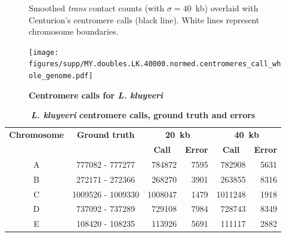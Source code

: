 \begin{figure}[ht!]

\caption{\textbf{Centromere calls for \textit{L. kluyveri}}}{
Smoothed \textit{trans} contact counts (with $\sigma=40$~kb) overlaid with
Centurion's centromere calls (black line). White lines represent chromosome
boundaries.
}
\begin{center}
\texttt{[image: figures/supp/MY.doubles.LK.40000.normed.centromeres\_call\_whole\_genome.pdf]}
\end{center}
\label{suppfig:LK_calls}
\end{figure}

\begin{table}[ht!]
\caption{\textbf{\textit{L. kluyveri} centromere calls, ground truth and
errors}}
\begin{center}
\begin{tabular}{c | c  r  r  r  r}
\textbf{Chromosome}  & \textbf{Ground truth} & \multicolumn{2}{c}{\textbf{20~kb}} & \multicolumn{2}{c}{\textbf{40~kb}} \\
  &   &  \multicolumn{1}{c}{\textbf{Call}} &  \multicolumn{1}{c}{\textbf{Error}} &  \multicolumn{1}{c}{\textbf{Call}} &  \multicolumn{1}{c}{\textbf{Error}} \\
\hline
A & \num[group-separator={\,}]{777082} - \num[group-separator={\,}]{777277} & \num[group-separator={\,}]{784872} & \small{\num[group-separator={\,}]{7595}}  & \num[group-separator={\,}]{782908} & \small{\num[group-separator={\,}]{5631}}  \\
B & \num[group-separator={\,}]{272171} - \num[group-separator={\,}]{272366} & \num[group-separator={\,}]{268270} & \small{\num[group-separator={\,}]{3901}}  & \num[group-separator={\,}]{263855} & \small{\num[group-separator={\,}]{8316}}  \\
C & \num[group-separator={\,}]{1009526} - \num[group-separator={\,}]{1009330} & \num[group-separator={\,}]{1008047} & \small{\num[group-separator={\,}]{1479}}  & \num[group-separator={\,}]{1011248} & \small{\num[group-separator={\,}]{1918}}  \\
D & \num[group-separator={\,}]{737092} - \num[group-separator={\,}]{737289} & \num[group-separator={\,}]{729108} & \small{\num[group-separator={\,}]{7984}}  & \num[group-separator={\,}]{728743} & \small{\num[group-separator={\,}]{8349}}  \\
E & \num[group-separator={\,}]{108420} - \num[group-separator={\,}]{108235} & \num[group-separator={\,}]{113926} & \small{\num[group-separator={\,}]{5691}}  & \num[group-separator={\,}]{111117} & \small{\num[group-separator={\,}]{2882}}  \\

\end{tabular}
\end{center}
\end{table}

